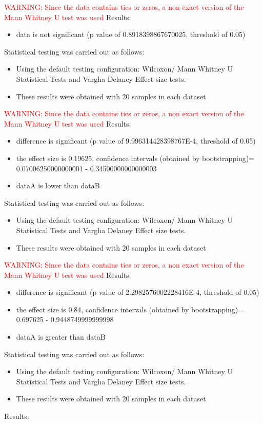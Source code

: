 \documentclass[]{article}
\begin{document}
\textcolor{Red}{WARNING: Since the data contains ties or zeros, a non exact version of the Mann Whitney U test was used
}
Results:
\begin{itemize}
\item{data is not significant (p value of 0.8918398867670025, threshold of 0.05)}
\end{itemize}Statistical testing was carried out as follows: \begin{itemize}
\item{Using the default testing configuration: Wilcoxon/ Mann Whitney U Statistical Tests and Vargha Delaney Effect size tests.}
\item{These results were obtained with 20 samples in each dataset}
\end{itemize}
\textcolor{Red}{WARNING: Since the data contains ties or zeros, a non exact version of the Mann Whitney U test was used
}
Results:
\begin{itemize}
\item{difference is significant (p value of 9.996314428398767E-4, threshold of 0.05)}
\item{the effect size is 0.19625, confidence intervals (obtained by bootstrapping)= 0.07006250000000001 - 0.34500000000000003}
\item{dataA is lower than dataB}
\end{itemize}Statistical testing was carried out as follows: \begin{itemize}
\item{Using the default testing configuration: Wilcoxon/ Mann Whitney U Statistical Tests and Vargha Delaney Effect size tests.}
\item{These results were obtained with 20 samples in each dataset}
\end{itemize}
\textcolor{Red}{WARNING: Since the data contains ties or zeros, a non exact version of the Mann Whitney U test was used
}
Results:
\begin{itemize}
\item{difference is significant (p value of 2.2982576002228416E-4, threshold of 0.05)}
\item{the effect size is 0.84, confidence intervals (obtained by bootstrapping)= 0.697625 - 0.9448749999999998}
\item{dataA is greater than dataB}
\end{itemize}Statistical testing was carried out as follows: \begin{itemize}
\item{Using the default testing configuration: Wilcoxon/ Mann Whitney U Statistical Tests and Vargha Delaney Effect size tests.}
\item{These results were obtained with 20 samples in each dataset}
\end{itemize}Results:
\end{document}
